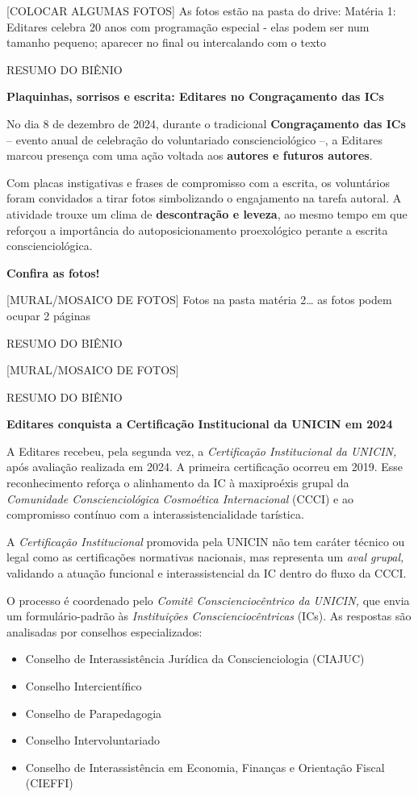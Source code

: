 {[}COLOCAR ALGUMAS FOTOS{]} As fotos estão na pasta do drive: Matéria 1: Editares celebra 20 anos com programação especial - elas podem ser num tamanho pequeno; aparecer no final ou intercalando com o texto

RESUMO DO BIÊNIO

\textbf{Plaquinhas, sorrisos e escrita: Editares no Congraçamento das ICs}

No dia 8 de dezembro de 2024, durante o tradicional \textbf{Congraçamento das ICs} -- evento anual de celebração do voluntariado conscienciológico --, a Editares marcou presença com uma ação voltada aos \textbf{autores e futuros autores}.

Com placas instigativas e frases de compromisso com a escrita, os voluntários foram convidados a tirar fotos simbolizando o engajamento na tarefa autoral. A atividade trouxe um clima de \textbf{descontração e leveza}, ao mesmo tempo em que reforçou a importância do autoposicionamento proexológico perante a escrita conscienciológica.

\textbf{Confira as fotos!}

{[}MURAL/MOSAICO DE FOTOS{]} Fotos na pasta matéria 2\ldots{} as fotos podem ocupar 2 páginas

RESUMO DO BIÊNIO

{[}MURAL/MOSAICO DE FOTOS{]}

RESUMO DO BIÊNIO

\textbf{Editares conquista a Certificação Institucional da UNICIN em 2024}

A Editares recebeu, pela segunda vez, a \emph{Certificação Institucional da UNICIN,} após avaliação realizada em 2024. A primeira certificação ocorreu em 2019. Esse reconhecimento reforça o alinhamento da IC à maxiproéxis grupal da \emph{Comunidade Conscienciológica Cosmoética Internacional} (CCCI) e ao compromisso contínuo com a interassistencialidade tarística.

A \emph{Certificação Institucional} promovida pela UNICIN não tem caráter técnico ou legal como as certificações normativas nacionais, mas representa um \emph{aval grupal,} validando a atuação funcional e interassistencial da IC dentro do fluxo da CCCI.

O processo é coordenado pelo \emph{Comitê Conscienciocêntrico da UNICIN,} que envia um formulário-padrão às \emph{Instituições Conscienciocêntricas} (ICs). As respostas são analisadas por conselhos especializados:

\begin{itemize}
\item
  Conselho de Interassistência Jurídica da Conscienciologia (CIAJUC)
\item
  Conselho Intercientífico
\item
  Conselho de Parapedagogia
\item
  Conselho Intervoluntariado
\item
  Conselho de Interassistência em Economia, Finanças e Orientação Fiscal (CIEFFI)
\end{itemize}

